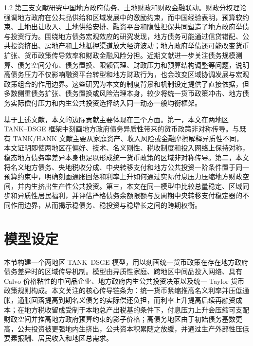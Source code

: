 \documentclass[12pt,UTF8]{ctexart}
\begin{document}
\begin{spacing}{1.2}
		第三支文献研究中国地方政府债务、土地财政和财政金融联动。财政分权理论强调地方政府在公共品供给和区域发展中的激励约束\cite{oates1972}，而中国经验表明，预算软约束、土地出让收入、土地供给安排、融资平台和隐性担保共同塑造了地方政府举债与投资行为\cite{jiang2016,zhao2017land,zhaomacro2021,bai2016,chen2020,cong2019}。围绕地方债务宏观效应的研究发现，地方债务可能通过信贷错配、公共投资挤出、房地产和土地抵押渠道放大经济波动\cite{xiong2021,liurong2021,mei2021,gaoran2022,zhao2022landprice}；地方政府举债还可能改变货币扩张、货币政策传导效率和财政金融风险分担\cite{liudebt2022,chenshuyue2024,wuhu2022}。近期文献进一步关注债务规模测算、债务空间分布、债务置换、限额管理、财政压力和预算结构调整等问题，说明高债务压力不仅影响融资平台转型和地方财政行为，也会改变区域协调发展与宏观政策组合的作用边界\cite{xuchao2020,lidaokui2024,zhao2024space,fan2025,zhangpeng2025,jifuxing2025,fengchen2026}。这些研究为本文的制度背景和机制设定提供了直接依据，但多数侧重债务扩张、债务置换或风险治理本身，较少将统一货币政策冲击、地方债务实际偿付压力和内生公共投资选择纳入同一动态一般均衡框架。
		
		基于上述文献，本文的边际贡献主要体现在三个方面。第一，本文在两地区 TANK--DSGE 框架中刻画地方政府债务异质性带来的货币政策非对称传导。与既有 TANK/HANK 文献主要从家庭资产、收入风险或金融摩擦解释异质性不同，本文证明即使两地区在偏好、技术、名义刚性、税收制度和投入网络上保持对称，稳态地方债务率差异本身也足以形成统一货币政策的区域非对称传导。第二，本文将名义地方债务、央地税收分成、中央转移支付和地方公共投资一阶条件置于同一预算约束中，明确刻画通胀回落和利率上升如何通过实际付息压力压缩地方财政空间，并内生挤出生产性公共投资。第三，本文在同一模型中比较总量稳定、区域同步和异质性居民福利，并评估严格债务余额限额与反周期中央转移支付稳定器的不同作用边界，从而揭示稳债务、稳投资与稳增长之间的跨期权衡。
		
		\section{模型设定}
		
		本节构建一个两地区 TANK--DSGE 模型，用以刻画统一货币政策在存在地方政府债务差异时的区域传导机制。模型由异质性家庭、跨地区中间品投入网络、具有 Calvo 价格粘性的中间品企业、地方政府内生公共投资决策以及统一 Taylor 货币政策规则构成。本文关注的核心传导链条为：统一货币紧缩推高名义利率并压低通胀，通胀回落提高到期名义债务的实际偿还负担，而利率上升提高后续再融资成本；在地方税收留成受制于本地总产出税基的条件下，付息压力上升会压缩可支配财政空间并推高地方政府预算约束的影子价格；高债务地区由于初始债务基数更高，公共投资被更强地内生挤出，公共资本积累随之放缓，并通过生产外部性压低要素报酬、居民收入和地区总需求。
		

\end{spacing}
\end{document}
